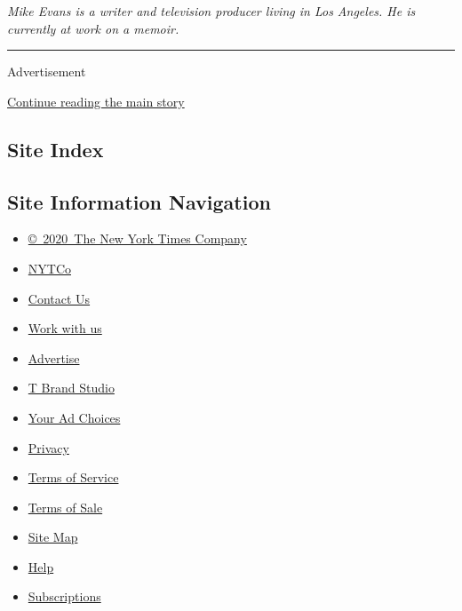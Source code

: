 \emph{Mike Evans is a writer and television producer living in Los
Angeles. He is currently at work on a memoir.}

\begin{center}\rule{0.5\linewidth}{\linethickness}\end{center}

Advertisement

\protect\hyperlink{after-bottom}{Continue reading the main story}

\hypertarget{site-index}{%
\subsection{Site Index}\label{site-index}}

\hypertarget{site-information-navigation}{%
\subsection{Site Information
Navigation}\label{site-information-navigation}}

\begin{itemize}
\tightlist
\item
  \href{https://help.nytimes3xbfgragh.onion/hc/en-us/articles/115014792127-Copyright-notice}{©~2020~The
  New York Times Company}
\end{itemize}

\begin{itemize}
\tightlist
\item
  \href{https://www.nytco.com/}{NYTCo}
\item
  \href{https://help.nytimes3xbfgragh.onion/hc/en-us/articles/115015385887-Contact-Us}{Contact
  Us}
\item
  \href{https://www.nytco.com/careers/}{Work with us}
\item
  \href{https://nytmediakit.com/}{Advertise}
\item
  \href{http://www.tbrandstudio.com/}{T Brand Studio}
\item
  \href{https://www.nytimes3xbfgragh.onion/privacy/cookie-policy\#how-do-i-manage-trackers}{Your
  Ad Choices}
\item
  \href{https://www.nytimes3xbfgragh.onion/privacy}{Privacy}
\item
  \href{https://help.nytimes3xbfgragh.onion/hc/en-us/articles/115014893428-Terms-of-service}{Terms
  of Service}
\item
  \href{https://help.nytimes3xbfgragh.onion/hc/en-us/articles/115014893968-Terms-of-sale}{Terms
  of Sale}
\item
  \href{https://spiderbites.nytimes3xbfgragh.onion}{Site Map}
\item
  \href{https://help.nytimes3xbfgragh.onion/hc/en-us}{Help}
\item
  \href{https://www.nytimes3xbfgragh.onion/subscription?campaignId=37WXW}{Subscriptions}
\end{itemize}
